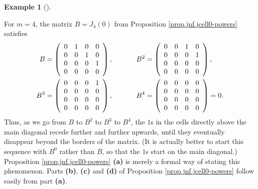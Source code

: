 \documentclass[numbers=enddot,12pt,final,onecolumn,notitlepage]{scrartcl}%
\numberwithin{exer}{subsection}
\theoremstyle{definition}
\newtheorem{exam}[theo]{Example}
\newenvironment{example}[1][]
{\begin{exam}[#1]\begin{leftbar}}
{\end{leftbar}\end{exam}}
\begin{document}
\begin{example}
For $m=4$, the matrix $B=J_{4}\left(  0\right)  $ from Proposition
\ref{prop.jnf.jcell0-powers} satisfies%
\begin{align*}
B  &  =\left(
\begin{array}
[c]{cccc}%
0 & 1 & 0 & 0\\
0 & 0 & 1 & 0\\
0 & 0 & 0 & 1\\
0 & 0 & 0 & 0
\end{array}
\right)  ,\ \ \ \ \ \ \ \ \ \ B^{2}=\left(
\begin{array}
[c]{cccc}%
0 & 0 & 1 & 0\\
0 & 0 & 0 & 1\\
0 & 0 & 0 & 0\\
0 & 0 & 0 & 0
\end{array}
\right)  ,\\
B^{3}  &  =\left(
\begin{array}
[c]{cccc}%
0 & 0 & 0 & 1\\
0 & 0 & 0 & 0\\
0 & 0 & 0 & 0\\
0 & 0 & 0 & 0
\end{array}
\right)  ,\ \ \ \ \ \ \ \ \ \ B^{4}=\left(
\begin{array}
[c]{cccc}%
0 & 0 & 0 & 0\\
0 & 0 & 0 & 0\\
0 & 0 & 0 & 0\\
0 & 0 & 0 & 0
\end{array}
\right)  =0.
\end{align*}
Thus, as we go from $B$ to $B^{2}$ to $B^{3}$ to $B^{4}$, the $1$s in the
cells directly above the main diagonal recede further and further upwards,
until they eventually disappear beyond the borders of the matrix. (It is
actually better to start this sequence with $B^{0}$ rather than $B$, so that
the $1$s start on the main diagonal.) Proposition \ref{prop.jnf.jcell0-powers}
\textbf{(a)} is merely a formal way of stating this phenomenon. Parts
\textbf{(b)}, \textbf{(c)} and \textbf{(d)} of Proposition
\ref{prop.jnf.jcell0-powers} follow easily from part \textbf{(a)}.
\end{example}
\end{document}

